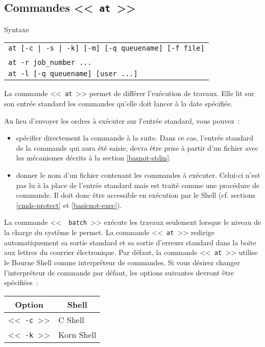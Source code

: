 \subsection{Commandes <<~{\tt at}~>>}

\begin{definition}{Syntaxe}
\begin{tabular}{@{\hspace{0.5cm}}l}
	{\tt at [-c | -s | -k] [-m] [-q queuename] [-f file]} \\
	\hspace{1cm}{\tt date [increment] [command | file]}\\[0.2cm]
	{\tt at -r job\_number ...}\\[0.2cm]
	{\tt at -l [-q queuename] [user ...]}\\[0.2cm]
\end{tabular}
\end{definition}

La commande <<~\texttt{at}~>> permet de diff{\'e}rer
l'ex{\'e}cution de travaux. Elle lit sur son entr{\'e}e standard les commandes
qu'elle doit lancer {\`a} la date sp{\'e}cifi{\'e}e.

Au lieu d'envoyer les ordres {\`a} ex{\'e}cuter sur l'entr{\'e}e standard, vous pouvez~:
\begin{itemize}
	\item	sp{\'e}cifier directement la commande {\`a} la suite. Dans ce cas, l'entr{\'e}e standard
			de la commande qui aura {\'e}t{\'e} saisie, devra {\^e}tre prise {\`a} partir d'un fichier
			avec les m{\'e}canismes d{\'e}crits {\`a} la section \ref{basnot-stdin}.
	\item	donner le nom d'un fichier contenant les commandes {\`a} ex{\'e}cuter. Celui-ci n'est pas
			lu {\`a} la place de l'entr{\'e}e standard mais est trait{\'e} comme une proc{\'e}dure de commande.
			Il doit donc {\^e}tre accessible en ex{\'e}cution par le Shell (cf. sections
			\ref{cmds-protect} et \ref{basicnot-exec}).
\end{itemize}

La commande <<~\texttt{ batch}~>> ex{\'e}cute les travaux seulement lorsque le
niveau de la charge du syst{\`e}me le permet. La commande <<~\texttt{at}~>>
redirige automatiquement sa sortie standard et sa sortie d'erreurs
standard dans la boite aux lettres du courrier {\'e}lectronique. Par d{\'e}faut,
la commande <<~\texttt{at}~>> utilise le Bourne Shell comme interpr{\'e}teur de
commandes. Si vous d{\'e}sirez changer l'interpr{\'e}teur de commande par
d{\'e}faut, les options suivantes devront {\^e}tre sp{\'e}cifi{\'e}es~:
\begin{center}
\begin{tabular}{|l|l|}
	\hline
		\multicolumn{1}{|c|}{Option}		&
		\multicolumn{1}{|c|}{Shell}			\\
	\hline \hline
		<<~{\tt -c}~>>	&	C Shell			\\
	\hline
		<<~{\tt -k}~>>	&	Korn Shell		\\
	\hline
\end{tabular}
\end{center}


